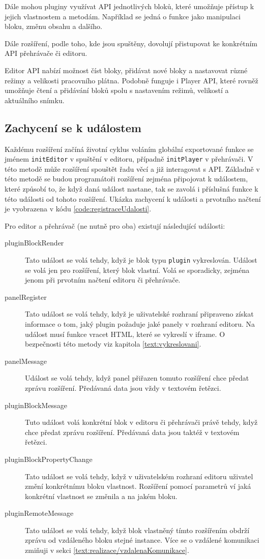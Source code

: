 Dále mohou pluginy využívat API jednotlivých bloků, které umožňuje přístup k jejich vlastnostem a metodám.
Například se jedná o funkce jako manipulaci bloku, změnu obsahu a dalšího.

Dále rozšíření, podle toho, kde jsou spuštěny, dovolují přistupovat ke konkrétním API přehrávače či editoru.

Editor API nabízí možnost číst bloky, přidávat nové bloky a nastavovat různé režimy a velikosti pracovního plátna. 
Podobně funguje i Player API, které rovněž umožňuje čtení a přidávání bloků spolu s nastavením režimů, velikostí a aktuálního snímku.

\subsection{Zachycení se k událostem}

Každému rozšíření začíná životní cyklus voláním globální exportované funkce se jménem \texttt{initEditor} v spuštění v editoru, případně \texttt{initPlayer} v přehrávači.
V této metodě může rozšíření spouštět řadu věcí a již interagovat s API.
Základně v této metodě se budou programátoři rozšíření zejména připojovat k událostem, které způsobí to, že když daná událost nastane, tak se zavolá i příslušná funkce k této události od tohoto rozšíření. Ukázka zachycení k události a prvotního načtení je vyobrazena v kódu \ref{code:registraceUdalosti}.

Pro editor a přehrávač (ne nutně pro oba) existují následující události:

\begin{description}
    \item[pluginBlockRender] Tato událost se volá tehdy, když je blok typu \texttt{plugin} vykreslován. Událost se volá jen pro rozšíření, který blok vlastní. Volá se sporadicky, zejména jenom při prvotním načtení editoru či přehrávače. 
    \item[panelRegister] Tato událost se volá tehdy, když je uživatelské rozhraní připraveno získat informace o tom, jaký plugin požaduje jaké panely v rozhraní editoru. Na událost musí funkce vracet HTML, které se vykreslí v iframe. O bezpečnosti této metody viz kapitola \ref{text:vykreslovani}.
    \item[panelMessage] Událost se volá tehdy, když panel přiřazen tomuto rozšíření chce předat zprávu rozšíření. Předávaná data jsou vždy v textovém řetězci.
    \item[pluginBlockMessage] Tuto událost volá konkrétní blok v editoru či přehrávači právě tehdy, když chce předat zprávu rozšíření. Předávaná data jsou taktéž v textovém řetězci.
    \item[pluginBlockPropertyChange] Tato událost se volá tehdy, když v uživatelském rozhraní editoru uživatel změní konkrétnímu bloku vlastnost. Rozšíření pomocí parametrů ví jaká konkrétní vlastnost se změnila a na jakém bloku.
    \item[pluginRemoteMessage] Tato událost se volá tehdy, když blok vlastněný tímto rozšířením obdrží zprávu od vzdáleného bloku stejné instance. Více se o vzdálené komunikaci zmiňuji v sekci \ref{text:realizace/vzdalenaKomunikace}. 
\end{description}

